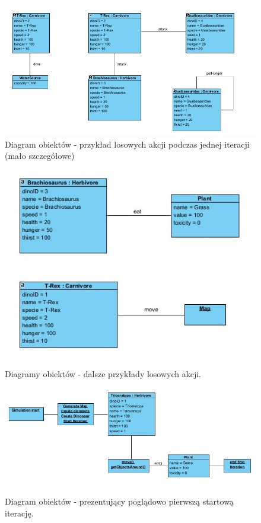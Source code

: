 \begin{figure}[h!]
    \centering
    \includegraphics[scale=0.70]{images/object/object_diagram_1.jpg}
    \caption{Diagram obiektów - przykład losowych akcji podczas jednej iteracji (mało szczegółowe)}
    \label{fig:obj1}
\end{figure}


\begin{figure}[h!]
    \centering
    \includegraphics[scale=0.70]{images/object/object_diagram_2.jpg}
    \caption{Diagramy obiektów - dalsze przykłady losowych akcji.}
    \label{fig:obj2}
\end{figure}
\newpage
\begin{figure}[h]
    \centering
    \includegraphics[scale=0.70]{images/object/object_diagram_3.jpg}
    \caption{Diagram obiektów - prezentujący poglądowo pierwszą startową iterację.}
    \label{fig:my_label}
\end{figure}

